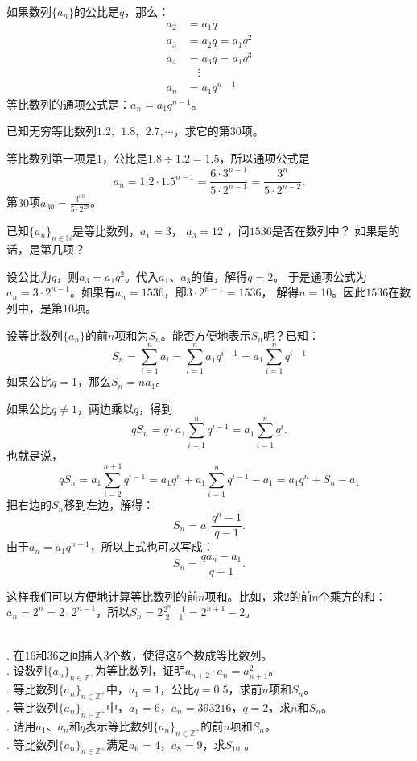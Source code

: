 \documentclass[12pt,UTF8]{ctexbook}
\begin{document}
如果数列$\{a_n\}$的公比是$q$，那么：
\begin{align*}
a_2 &= a_1 q   \\
a_3 &= a_2 q = a_1 q^2  \\
a_4 &= a_3 q = a_1 q^3  \\
&\quad \vdots  \\
a_n &= a_1 q^{n-1}  
\end{align*}
等比数列的通项公式是：$a_n = a_1 q^{n-1}$。
\begin{et}
    已知无穷等比数列$1.2,\;\,1.8,\;\,2.7, \cdots$，求它的第$30$项。    
\end{et}
\begin{so}
等比数列第一项是$1$，公比是$1.8\div1.2=1.5$，所以通项公式是
$$a_n = 1.2 \cdot 1.5^{n-1} = \frac{6\cdot3^{n-1}}{5\cdot2^{n-1}} = \frac{3^n}{5\cdot 2^{n-2}}.$$
第$30$项$a_{30} = \frac{3^{30}}{5\cdot 2^{28}}$。
\end{so}
\begin{et}
    已知$\{a_n\}_{n\in\mathbb{N}}$是等比数列，$a_1 = 3$， $a_3 = 12$ ，问$1536$是否在数列中？
    如果是的话，是第几项？    
\end{et}
\begin{so}
    设公比为$q$，则$a_3 = a_1 q^2$。代入$a_1$、$a_3$的值，解得$q = 2$。
    于是通项公式为$a_n = 3\cdot 2^{n-1}$。如果有$a_n = 1536$，即$3\cdot2^{n-1}=1536$，
    解得$n = 10$。因此$1536$在数列中，是第$10$项。    
\end{so}

设等比数列$\{a_n\}$的前$n$项和为$S_n$。能否方便地表示$S_n$呢？已知：
$$ S_n = \sum_{i=1}^n a_i = \sum_{i=1}^n a_1 q^{i-1} = a_1 \sum_{i=1}^n q^{i-1} $$
如果公比$q = 1$，那么$S_n = na_1$。

如果公比$q \neq 1$，两边乘以$q$，得到
$$ q S_n = q \cdot a_1 \sum_{i=1}^n q^{i-1} = a_1 \sum_{i=1}^n q^{i}.$$
也就是说，
$$ qS_n = a_1 \sum_{i=2}^{n+1} q^{i-1} = a_1 q^n + a_1 \sum_{i=1}^{n} q^{i-1} - a_1  = a_1 q^n + S_{n} - a_1$$
把右边的$S_n$移到左边，解得：
$$ S_n = a_1\frac{q^n - 1}{q - 1}. $$
由于$a_n = a_1q^{n-1}$，所以上式也可以写成：
$$ S_n = \frac{q a_n - a_1}{q - 1}. $$

这样我们可以方便地计算等比数列的前$n$项和。比如，求$2$的前$n$个乘方的和：$a_n = 2^{n} = 2\cdot 2^{n-1}$，所以$S_n =2\frac{2^{n}-1}{2-1} = 2^{n+1} - 2$。
\begin{xt}
    \mbox{} \\
    . 在$16$和$36$之间插入$3$个数，使得这$5$个数成等比数列。 \\
    . 设数列$\{a_n\}_{n\in\mathbb{Z}^+}$为等比数列，证明$a_{n+2} \cdot a_n = a_{n+1}^2$。 \\
    . 等比数列$\{a_n\}_{n\in\mathbb{Z}^+}$中，$a_1 = 1$，公比$q = 0.5$，求前$n$项和$S_n$。 \\
    . 等比数列$\{a_n\}_{n\in\mathbb{Z}^+}$中，$a_1 = 6$，$a_n = 393216$，$q = 2$，求$n$和$S_n$。 \\
    . 请用$a_1$、$a_n$和$q$表示等比数列$\{a_n\}_{n\in\mathbb{Z}^+}$的前$n$项和$S_n$。 \\
    . 等比数列$\{a_n\}_{n\in\mathbb{Z}^+}$满足$a_6 = 4$，$a_{8}=9$，求$S_{10}$ 。
\end{xt}
\end{document}
